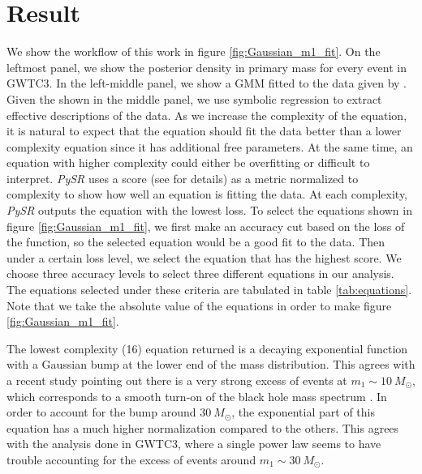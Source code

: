 \documentclass[nohyperref]{article}
\newcommand\pysr{\textit{PySR}\xspace}
\theoremstyle{plain}
\theoremstyle{definition}
\theoremstyle{remark}
\begin{document}
\section{Result}
\label{sec:result}

We show the workflow of this work in figure \ref{fig:Gaussian_m1_fit}.
On the leftmost panel, we show the posterior density in primary mass for every event in GWTC3.
In the left-middle panel, we show a GMM fitted to the data given by \cite{Tiwari:2020vym}.
Given the \ppd shown in the middle panel, we use symbolic regression to extract effective descriptions of the data. 
As we increase the complexity of the equation, it is natural to expect that the equation should fit the data better than a lower complexity equation since it has additional free parameters.
At the same time, an equation with higher complexity could either be overfitting or difficult to interpret.
\pysr uses a score (see \citealt{cranmerDiscoveringSymbolicModels2020} for details) as a metric normalized to complexity to show how well an equation is fitting the data.
At each complexity, \pysr outputs the equation with the lowest loss.
To select the equations shown in figure \ref{fig:Gaussian_m1_fit}, we first make an accuracy cut based on the loss of the function, so the selected equation would be a good fit to the data.
Then under a certain loss level, we select the equation that has the highest score.
We choose three accuracy levels to select three different equations in our analysis.
The equations selected under these criteria are tabulated in table \ref{tab:equations}.
Note that we take the absolute value of the equations in order to make figure \ref{fig:Gaussian_m1_fit}.

The lowest complexity (16) equation returned is a decaying exponential function with a Gaussian bump at the lower end of the mass distribution.
This agrees with a recent study pointing out there is a very strong excess of events at $m_{1}\sim 10\ M_{\odot}$,
which corresponds to a smooth turn-on of the black hole mass spectrum \cite{Talbot:2018cva}.
In order to account for the bump around $30\ M_{\odot}$,
the exponential part of this equation has a much higher normalization compared to the others.
This agrees with the analysis done in GWTC3, where a single power law seems to have trouble accounting for the excess of events around $m_{1}\sim 30\ M_{\odot}$\cite{LIGOScientific:2021psn}.
\end{document}
